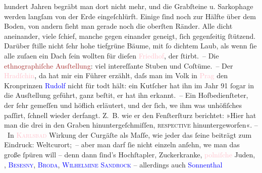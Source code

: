                     hundert Jahren begräbt man dort nicht mehr, und die Grabſteine u. Sarkophage
                    werden langſam von der Erde eingeſchlürft. Einige ſind noch zur Hälfte über dem
                    Boden, von andern ſieht man gerade noch die oberſten Ränder. Alle dicht
                    aneinander, viele ſchief, manche gegen einander geneigt, ſich gegenſeitig {\pb}ſtützend. Darüber ſtille nicht ſehr hohe
                    tiefgrüne Bäume, mit ſo dichtem Laub, als wenn ſie alle zuſa{\geminationm}en ein Dach ſein wollten für dieſen \textcolor{pink}{Friedhof}{}, der ſtirbt. – Die \textcolor{brown}{ethnographiſche Ausſtellung}{}\ledrightnote{\textcolor{brown}{Čecho-slavische ethnographische Ausstellung}}: viel intereſſante
                    Stuben und Coſtüme. – Der \textcolor{pink}{Hradſchin}{}\ledrightnote{\textcolor{pink}{Hradčany}}, da
                    hat mir ein Führer erzählt, daſs man im Volk in \textcolor{pink}{Prag}{}\ledrightnote{\textcolor{pink}{Prag}} den Kronprinzen \textcolor{blue}{Rudolf}{}\ledrightnote{\textcolor{blue}{Rudolf von Österreich-Ungarn}}
                    nicht für todt hält: ein Kutſcher hat ihn im Jahr 91{ }ſogar in die
                    Ausſtellung geführt, ganz beſti{\geminationm}t, er hat ihn
                    erkannt. – Ein Hofbedienſteter, der ſehr gemeſſen und höflich erläutert, und der
                    ſich, we{\geminationn} ihm was unhöfiſches paſſirt, ſchnell
                    wieder derfangt. Z. B. {\pb}wie er den Fenſterſturz
                    berichtet: »Hier hat man die drei in den Graben hinuntergeſchmiſſen, \textsc{reſpective} hinuntergeworfen«.\pend
           \pstart
           – In \textcolor{pink}{\textsc{Karlsbad}}{}\ledrightnote{\textcolor{pink}{Karlsbad}} Wirkung der Curgäſte als Maſſe, wie jeder das ſeine beiträgt zum
                    Eindruck: Weltcurort; – aber man darf ſie nicht einzeln anſehn, we{\geminationn} man das große ſpüren will – denn dann ſind’s
                    Hochſtapler, Zuckerkranke, \textcolor{pink}{polniſche}{}\ledrightnote{\textcolor{pink}{Polen}} Juden, \label{K_L00462_1v}\label{K_L00462_1h}, \textcolor{blue}{\textsc{Besesny}}{}\ledrightnote{\textcolor{blue}{Josef von Bezecný}}, \textcolor{blue}{\textsc{Broda}}{}\ledrightnote{\textcolor{blue}{Moritz Broda}}, \textcolor{blue}{\textsc{Wilhelmine Sandrock}}{}\ledrightnote{\textcolor{blue}{Wilhelmine Sandrock}} – allerdings auch \textcolor{blue}{Sonnenthal}{}\ledrightnote{\textcolor{blue}{Adolf von Sonnenthal}}
